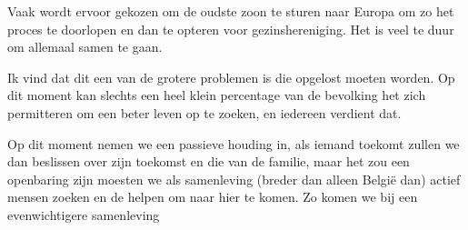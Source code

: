 \documentclass[12pt, a4paper]{paper}
\begin{document}
Vaak wordt ervoor gekozen om de oudste zoon te sturen naar Europa om zo het proces te doorlopen en dan te opteren voor gezinshereniging. Het is veel te duur om allemaal samen te gaan.

Ik vind dat dit een van de grotere problemen is die opgelost moeten worden. Op dit moment kan slechts een heel klein percentage van de bevolking het zich permitteren om een beter leven op te zoeken, en iedereen verdient dat.

Op dit moment nemen we een passieve houding in, als iemand toekomt zullen we dan beslissen over zijn toekomst en die van de familie, maar het zou een openbaring zijn moesten we als samenleving (breder dan alleen België dan) actief mensen zoeken en de helpen om naar hier te komen. Zo komen we bij een evenwichtigere samenleving

\end{document}
